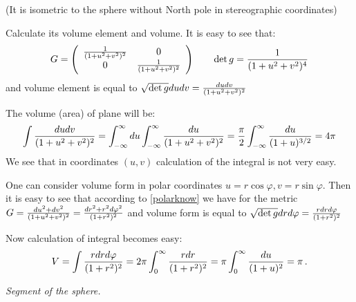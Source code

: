 \documentclass[12pt]{article}
\theoremstyle{theorem}
\numberwithin{equation}{section}
\begin{document}
(It is isometric to the sphere without North pole in stereographic coordinates)

   Calculate its volume element and volume.
            It is easy to see that:
                    \begin{equation}\label{}
    G=\left(
    \begin{array}{cc}
  {1\over (1+u^2+v^2)^2} & 0 \\
  0&  {1\over (1+u^2+v^2)^2} \\
\end{array}
\right)
\qquad
  \det g= {1\over (1+u^2+v^2)^4}
\end{equation}
and volume element is equal to  $\sqrt {\det g}dudv= {dudv\over (1+u^2+v^2)^2}$

The volume (area) of plane will be:
                 $$
      \int {dudv\over (1+u^2+v^2)^2}=\int_{-\infty}^{\infty} du \int_{-\infty}^{\infty}
         {du\over (1+u^2+v^2)^2}={\pi\over 2}\int_{-\infty}^{\infty} {du\over (1+u)^{3/2}}=4\pi
                 $$
We see that in coordinates $(u,v)$ calculation of the integral is not very easy.

One can consider volume form in polar coordinates
$u=r\cos\varphi, v=r\sin\varphi$.
Then it is easy to see that according to \eqref{polarknow}
 we have for the metric $G={du^2+dv^2\over (1+u^2+v^2)^2}={dr^2+r^2d\varphi^2\over (1+r^2)^2}$
and volume form is equal to
$\sqrt {\det g}drd\varphi={rdr d \varphi\over (1+r^2)^2}$

Now calculation of integral becomes easy:
                  $$
    V=\int   {rdr d \varphi\over (1+r^2)^2}=2\pi \int_0^\infty {rdr\over (1+r^2)^2}=
                  \pi \int_0^\infty {du\over (1+u)^2}=\pi\,.
                  $$

                  \medskip
  {\it Segment of the sphere.}
\end{document}
